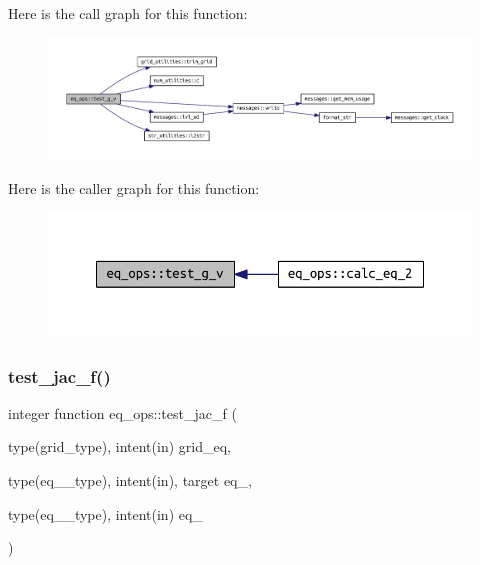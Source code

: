 Here is the call graph for this function\+:
\nopagebreak
\begin{figure}[H]
\begin{center}
\leavevmode
\includegraphics[width=350pt]{namespaceeq__ops_a9811c83477d9d85f7401fd7957a590fc_cgraph}
\end{center}
\end{figure}
Here is the caller graph for this function\+:
\nopagebreak
\begin{figure}[H]
\begin{center}
\leavevmode
\includegraphics[width=348pt]{namespaceeq__ops_a9811c83477d9d85f7401fd7957a590fc_icgraph}
\end{center}
\end{figure}
\mbox{\label{namespaceeq__ops_a05dcd4803b9c7845d3353614c9630c23}} 
\subsubsection{\texorpdfstring{test\+\_\+jac\+\_\+f()}{test\_jac\_f()}}
{\footnotesize\ttfamily integer function eq\+\_\+ops\+::test\+\_\+jac\+\_\+f (\begin{DoxyParamCaption}\item[{type(grid\+\_\+type), intent(in)}]{grid\+\_\+eq,  }\item[{type(eq\+\_\+1\+\_\+type), intent(in), target}]{eq\+\_,  }\item[{type(eq\+\_\+2\+\_\+type), intent(in)}]{eq\+\_ }\end{DoxyParamCaption})}



